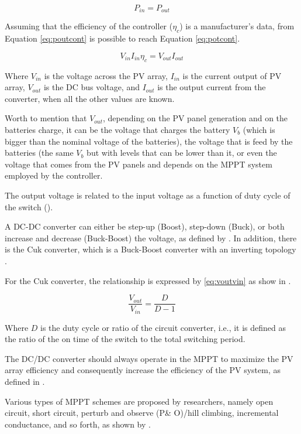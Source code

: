 \begin{equation}
\label{eq:poutcont}
P_{in} = P_{out}
\end{equation}

Assuming that the efficiency of the controller ($ \eta_{c} $) is a manufacturer's data, from Equation \ref{eq:poutcont} is possible to reach Equation \ref{eq:potcont}.

\begin{equation}
\label{eq:potcont}
V_{in} I_{in} \eta_{c} = V_{out} I_{out}
\end{equation}

Where $ V_{in} $ is the voltage across the PV array, $ I_{in} $ is the current output of PV array, $ V_{out}$ is the  DC bus voltage, and $I_{out}$ is the output current from the converter, when all the other values are known.

Worth to mention that $ V_{out}$, depending on the PV panel generation and on the batteries charge, it can be the voltage that charges the battery $V_{b}$ (which is bigger than the nominal voltage of the batteries), the voltage that is feed by the batteries (the same $V_{b}$ but with levels that can be lower than it, or even the voltage that comes from the PV panels and depends on the MPPT system employed by the controller.

The output voltage is related to the input voltage as a function of duty cycle of the switch (\cite{Abdulateef}). 
 
A DC-DC converter can either be step-up (Boost), step-down (Buck), or both increase and decrease (Buck-Boost) the voltage, as defined by \cite{Mahanta}. In addition, there is the Cuk converter, which is a Buck-Boost converter with an inverting topology \cite{Catherine}. 

For the Cuk converter, the relationship is expressed by \ref{eq:voutvin} as show in \cite{Abdulateef}.

\begin{equation}
\label{eq:voutvin}
\dfrac{V_{out}}{V_{in}} = \dfrac{D}{D-1}
\end{equation}

Where $D$ is the duty cycle or ratio of the circuit converter, i.e., it is defined as the ratio of the on time of the switch to the total switching period.
 
The DC/DC converter should always operate in the MPPT to maximize the PV array efficiency and consequently increase the efficiency of the PV system, as defined in \cite{Yatimi}.
  
Various types of MPPT schemes are proposed by researchers, namely open circuit, short circuit, perturb and observe (P\& O)/hill climbing, incremental conductance, and so forth, as shown by \cite{Haque}.
 
